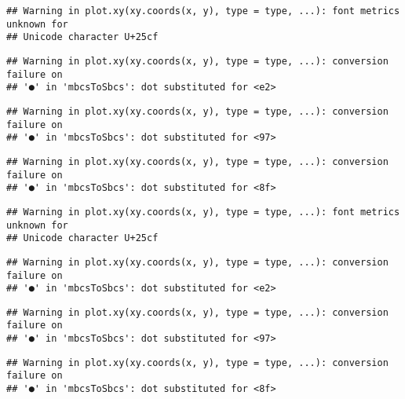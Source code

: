 \documentclass[
]{article}
\newenvironment{Shaded}{\begin{snugshade}}{\end{snugshade}}
\newcommand{\AttributeTok}[1]{\textcolor[rgb]{0.77,0.63,0.00}{#1}}
\newcommand{\FunctionTok}[1]{\textcolor[rgb]{0.00,0.00,0.00}{#1}}
\newcommand{\NormalTok}[1]{#1}
\newcommand{\SpecialCharTok}[1]{\textcolor[rgb]{0.00,0.00,0.00}{#1}}
\newcommand{\StringTok}[1]{\textcolor[rgb]{0.31,0.60,0.02}{#1}}
\begin{document}
\begin{verbatim}
## Warning in plot.xy(xy.coords(x, y), type = type, ...): font metrics unknown for
## Unicode character U+25cf
\end{verbatim}

\begin{Shaded}
\end{Shaded}

\begin{verbatim}
## Warning in plot.xy(xy.coords(x, y), type = type, ...): conversion failure on
## '●' in 'mbcsToSbcs': dot substituted for <e2>
\end{verbatim}

\begin{verbatim}
## Warning in plot.xy(xy.coords(x, y), type = type, ...): conversion failure on
## '●' in 'mbcsToSbcs': dot substituted for <97>
\end{verbatim}

\begin{verbatim}
## Warning in plot.xy(xy.coords(x, y), type = type, ...): conversion failure on
## '●' in 'mbcsToSbcs': dot substituted for <8f>
\end{verbatim}

\begin{verbatim}
## Warning in plot.xy(xy.coords(x, y), type = type, ...): font metrics unknown for
## Unicode character U+25cf
\end{verbatim}

\begin{verbatim}
## Warning in plot.xy(xy.coords(x, y), type = type, ...): conversion failure on
## '●' in 'mbcsToSbcs': dot substituted for <e2>
\end{verbatim}

\begin{verbatim}
## Warning in plot.xy(xy.coords(x, y), type = type, ...): conversion failure on
## '●' in 'mbcsToSbcs': dot substituted for <97>
\end{verbatim}

\begin{verbatim}
## Warning in plot.xy(xy.coords(x, y), type = type, ...): conversion failure on
## '●' in 'mbcsToSbcs': dot substituted for <8f>
\end{verbatim}
\end{document}
